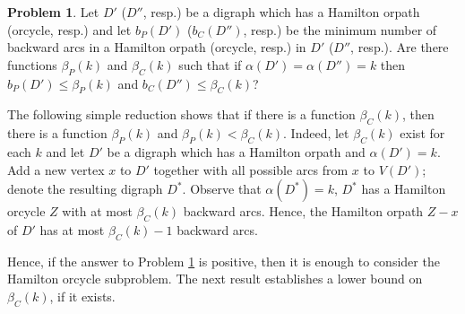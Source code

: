 \documentclass{article}
\newcommand{\2}{\vspace{2mm}}
\theoremstyle{definition}
\newtheorem{problem}[theorem]{Problem}
\begin{document}
\begin{problem}\label{op1}
Let $D'$ ($D''$, resp.) be a digraph which has a Hamilton orpath (orcycle, resp.) and let
$b_P(D')$ ($b_C(D'')$, resp.) be the minimum number of backward arcs in a Hamilton orpath (orcycle, resp.) in $D'$ ($D''$, resp.). Are there functions $\beta_P(k)$ and $\beta_C(k)$ such that if $\alpha(D')=\alpha(D'')=k$ then $b_P(D')\le \beta_P(k)$ and $b_C(D'')\le \beta_C(k)$?
\end{problem} 

The following simple reduction shows that if there is a function $\beta_C(k)$, then there is a function $\beta_P(k)$ and 
 $\beta_P(k)<\beta_C(k)$. 
Indeed, let $\beta_C(k)$ exist for each $k$ and let  $D'$ be a digraph which has a Hamilton orpath and $\alpha(D')=k$. Add a new vertex $x$ to $D'$ together with all possible arcs from $x$ to $V(D')$; denote the resulting digraph $D^*.$ Observe that 
$\alpha(D^*)=k$, $D^*$ has a Hamilton orcycle $Z$ with at most $\beta_C(k)$ backward arcs. Hence, the Hamilton orpath $Z-x$ of $D'$ has at most $\beta_C(k)-1$ backward arcs. 

Hence, if the answer to Problem \ref{op1} is positive, then it is enough to consider the Hamilton orcycle subproblem. 
The next result establishes a lower bound on $\beta_C(k)$, if it exists.
\end{document}
